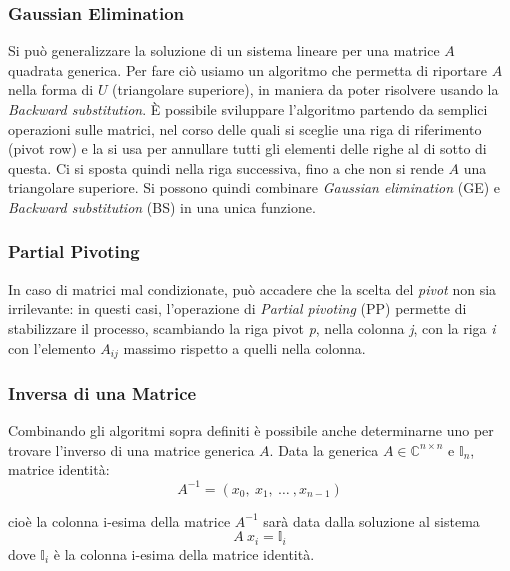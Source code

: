 \documentclass[11pt, a4paper]{article}
\begin{document}
\subsubsection{Gaussian Elimination}
Si può generalizzare la soluzione di un sistema lineare per una matrice $A$ quadrata generica. Per fare ciò usiamo un algoritmo che permetta di riportare $A$ nella forma di $U$ (triangolare superiore), in maniera da poter risolvere usando la \textit{Backward substitution}. È possibile sviluppare l'algoritmo partendo da semplici operazioni sulle matrici, nel corso delle quali si sceglie una riga di riferimento (pivot row) e la si usa per annullare tutti gli elementi delle righe al di sotto di questa. Ci si sposta quindi nella riga successiva, fino a che non si rende $A$ una triangolare superiore. Si possono quindi combinare \textit{Gaussian elimination} (GE) e \textit{Backward substitution} (BS) in una unica funzione.

\subsubsection{Partial Pivoting}
In caso di matrici mal condizionate, può accadere che la scelta del \textit{pivot} non sia irrilevante: in questi casi, l'operazione di \textit{Partial pivoting} (PP) permette di stabilizzare il processo, scambiando la riga pivot \textit{p}, nella colonna \textit{j}, con la riga \textit{i} con l'elemento $A_{ij}$ massimo rispetto a quelli nella colonna.

\subsubsection{Inversa di una Matrice} \label{sec: inverse of a matrix}
Combinando gli algoritmi sopra definiti è possibile anche determinarne uno per trovare l'inverso di una matrice generica $A$. Data la generica $A\in \mathbb{C}^{n\times n}$ e $\mathbb{I}_n$, matrice identità:
$$
A^{-1} = (x_0,\ x_1,\ \dots\ , x_{n-1})
$$

\noindent cioè la colonna i-esima della matrice $A^{-1}$ sarà data dalla soluzione al sistema 
$$
A\ x_i = \mathbb{I}_i  
$$
dove $\mathbb{I}_i$ è la colonna i-esima della matrice identità.

\newpage
\end{document}
